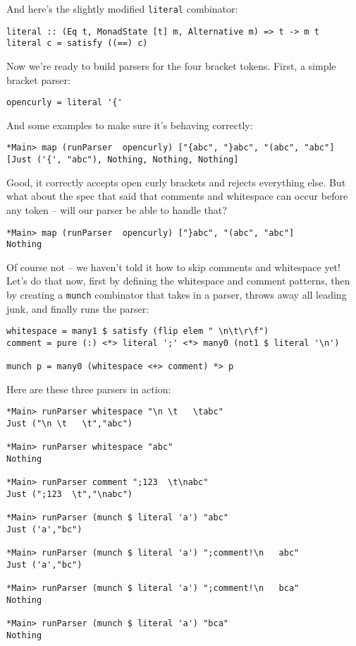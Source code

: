 \documentclass{tmr}
\begin{document}
And here's the slightly modified \verb+literal+ combinator:
\begin{verbatim}
literal :: (Eq t, MonadState [t] m, Alternative m) => t -> m t
literal c = satisfy ((==) c)
\end{verbatim}

Now we're ready to build parsers for the four bracket tokens.  
First, a simple bracket parser:
\begin{verbatim}
opencurly = literal '{'
\end{verbatim}

And some examples to make sure it's behaving correctly:
\begin{verbatim}
*Main> map (runParser  opencurly) ["{abc", "}abc", "(abc", "abc"]
[Just ('{', "abc"), Nothing, Nothing, Nothing]
\end{verbatim}

Good, it correctly accepts open curly brackets and rejects everything else.
But what about the spec that said that comments and whitespace can occur 
before any token -- will our parser be able to handle that?
\begin{verbatim}
*Main> map (runParser  opencurly) ["}abc", "(abc", "abc"]
Nothing
\end{verbatim}

Of course not -- we haven't told it how to skip comments and whitespace yet!
Let's do that now, first by defining the whitespace and comment patterns, then
by creating a \verb+munch+ combinator that takes in a parser, 
throws away all leading junk, and finally runs the parser:
\begin{verbatim}
whitespace = many1 $ satisfy (flip elem " \n\t\r\f")
comment = pure (:) <*> literal ';' <*> many0 (not1 $ literal '\n')

munch p = many0 (whitespace <+> comment) *> p
\end{verbatim}

Here are these three parsers in action:
\begin{verbatim}
*Main> runParser whitespace "\n \t   \tabc"
Just ("\n \t   \t","abc")

*Main> runParser whitespace "abc"
Nothing

*Main> runParser comment ";123  \t\nabc"
Just (";123  \t","\nabc")

*Main> runParser (munch $ literal 'a') "abc"
Just ('a',"bc")

*Main> runParser (munch $ literal 'a') ";comment!\n   abc"
Just ('a',"bc")

*Main> runParser (munch $ literal 'a') ";comment!\n   bca"
Nothing

*Main> runParser (munch $ literal 'a') "bca"
Nothing
\end{verbatim}
\end{document}
